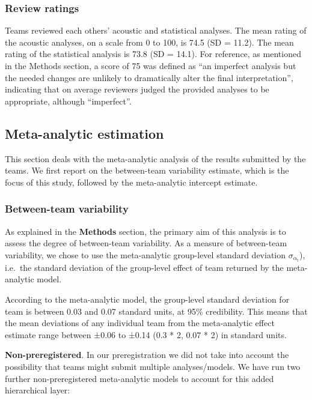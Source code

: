 \documentclass[Review,times,sageh]{sagej}
\begin{document}
\hypertarget{review-ratings}{%
\subsubsection{Review ratings}\label{review-ratings}}

Teams reviewed each others' acoustic and statistical analyses.
The mean rating of the acoustic analyses, on a scale from 0 to 100, is 74.5 (SD = 11.2).
The mean rating of the statistical analysis is 73.8 (SD = 14.1).
For reference, as mentioned in the Methods section, a score of 75 was defined as ``an imperfect analysis but the needed changes are unlikely to dramatically alter the final interpretation'', indicating that on average reviewers judged the provided analyses to be appropriate, although ``imperfect''.

\hypertarget{meta-analytic-estimation}{%
\subsection{Meta-analytic estimation}\label{meta-analytic-estimation}}

This section deals with the meta-analytic analysis of the results submitted by the teams.
We first report on the between-team variability estimate, which is the focus of this study, followed by the meta-analytic intercept estimate.

\hypertarget{between-team-variability}{%
\subsubsection{Between-team variability}\label{between-team-variability}}

As explained in the \textbf{Methods} section, the primary aim of this analysis is to assess the degree of between-team variability.
As a measure of between-team variability, we chose to use the meta-analytic group-level standard deviation \(\sigma_{\alpha_{\text{t}}}\)), i.e.~the standard deviation of the group-level effect of team returned by the meta-analytic model.

According to the meta-analytic model, the group-level standard deviation for team is between 0.03 and 0.07 standard units, at 95\% credibility.
This means that the mean deviations of any individual team from the meta-analytic effect estimate range between ±0.06 to ±0.14 (0.3 * 2, 0.07 * 2) in standard units.

\textbf{Non-preregistered}. In our preregistration we did not take into account the possibility that teams might submit multiple analyses/models.
We have run two further non-preregistered meta-analytic models to account for this added hierarchical layer:
\end{document}
